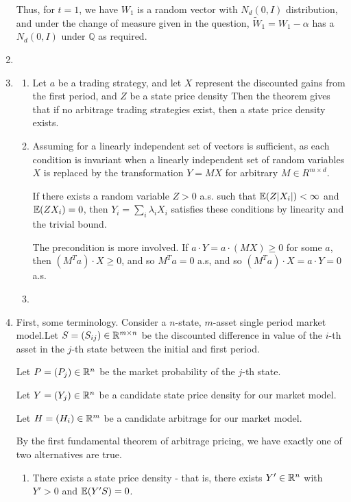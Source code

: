 \begin{enumerate}
  Thus, for $t = 1$, we have $W_{1}$ is a random vector with $N_{d}(0,
  I)$ distribution, and under the change of measure given in the
  question, $\tilde W_{1} = W_{1} - \alpha$ has a $N_{d}(0, I)$ under
  $\mathbb{Q}$ as required.
\item \label{item:4}
\item \label{item:5}
  \begin{enumerate}
  \item Let $a$ be a trading strategy, and let $X$ represent the
    discounted gains from the first period, and $Z$ be a state price
    density Then the theorem gives that if no arbitrage trading
    strategies exist, then a state price density exists.
  \item Assuming for a linearly independent set of vectors is
    sufficient, as each condition is invariant when a linearly
    independent set of random variables $X$ is replaced by the
    transformation $Y = M X$ for arbitrary $M \in R^{m \times d}$.

    If there exists a random variable $Z > 0$ a.s. such that $\E{Z
      |X_{i}|} < \infty$ and $\E{Z X_{i}} = 0$, then $Y_{i} = \sum_{i}
    \lambda_{i} X_{i}$ satisfies these conditions by linearity and the
    trivial bound.

    The precondition is more involved.  If $a \cdot Y = a \cdot (M X) \geq 0$ for
    some $a$, then $(M^{T} a) \cdot X \geq 0$, and so $M^{T} a = 0$
    a.s, and so $(M^{T} a) \cdot X = a \cdot Y = 0$ a.s.
  \item 
  \end{enumerate}
  
\item \label{item:6} First, some terminology. Consider a $n$-state,
  $m$-asset single period market model.Let $S = (S_{ij}) \in \mathbb{R}^{m
    \times n}$ be the discounted difference in value of the $i$-th
  asset in the $j$-th state between the initial and first period.

  Let $P = (P_{j}) \in \mathbb{R}^{n}$ be the market probability of the $j$-th
  state.

  Let $Y = (Y_{j}) \in \mathbb{R}^{n}$ be a candidate state price density for
  our market model.

  Let $H = (H_{i}) \in \mathbb{R}^{m}$ be a candidate arbitrage for our market
  model.

  By the first fundamental theorem of arbitrage pricing, we have
  exactly one of two alternatives are true.
  \begin{enumerate}
  \item There exists a state price density - that is, there exists $Y' \in \mathbb{R}^{n}$
    with $Y' > 0$ and $\E{Y'S} = 0$.


\end{enumerate}
\end{enumerate}
